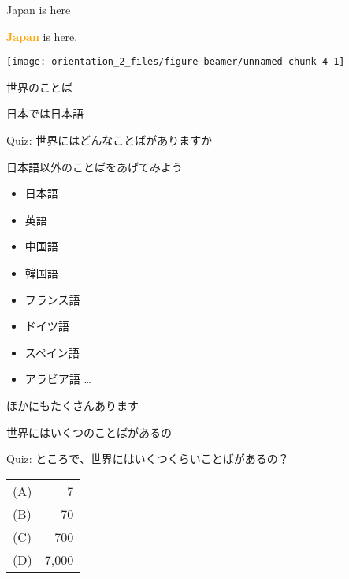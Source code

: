 \documentclass[
  ignorenonframetext,
  aspectratio=169,
  xcolor=dvipsnames]{beamer}
\providecommand{\tightlist}{%
  \setlength{\itemsep}{0pt}\setlength{\parskip}{0pt}}
\begin{document}
\begin{frame}{Japan is here}
\label{japan-is-here}
\Large

\textcolor{orange}{\bfseries Japan} is here.

\texttt{[image: orientation\_2\_files/figure-beamer/unnamed-chunk-4-1]}
\end{frame}

\begin{frame}{世界のことば}
\label{ux4e16ux754cux306eux3053ux3068ux3070-1}
\Large

日本では日本語

\pause

Quiz: 世界にはどんなことばがありますか
\end{frame}

\begin{frame}{日本語以外のことばをあげてみよう}
\label{ux65e5ux672cux8a9eux4ee5ux5916ux306eux3053ux3068ux3070ux3092ux3042ux3052ux3066ux307fux3088ux3046}
\Large

\begin{itemize}[<+->]
\tightlist
\item
  日本語
\item
  英語
\item
  中国語
\item
  韓国語
\item
  フランス語
\item
  ドイツ語
\item
  スペイン語
\item
  アラビア語 \ldots
\end{itemize}

\pause

ほかにもたくさんあります
\end{frame}

\begin{frame}{世界にはいくつのことばがあるの}
\label{ux4e16ux754cux306bux306fux3044ux304fux3064ux306eux3053ux3068ux3070ux304cux3042ux308bux306e}
\Large

Quiz: ところで、世界にはいくつくらいことばがあるの？

\pause

\vfill

\centering
\begin{tabular}{lr}
(A) &7\\\pause
(B) &70\\\pause
(C) &700\\\pause
(D) &7,000
\end{tabular}

\vfill
\end{frame}
\end{document}
